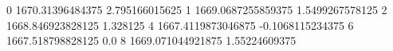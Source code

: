 0 1670.31396484375 2.795166015625
1 1669.0687255859375 1.5499267578125
2 1668.846923828125 1.328125
4 1667.4119873046875 -0.1068115234375
6 1667.518798828125 0.0
8 1669.071044921875 1.55224609375
